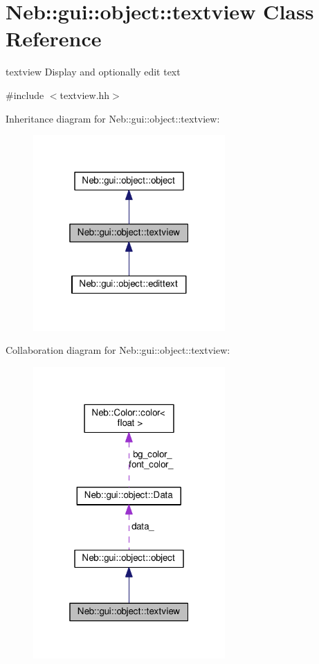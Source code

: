 \hypertarget{classNeb_1_1gui_1_1object_1_1textview}{\section{Neb\-:\-:gui\-:\-:object\-:\-:textview Class Reference}
\label{classNeb_1_1gui_1_1object_1_1textview}
}


textview Display and optionally edit text  




{\ttfamily \#include $<$textview.\-hh$>$}



Inheritance diagram for Neb\-:\-:gui\-:\-:object\-:\-:textview\-:
\nopagebreak
\begin{figure}[H]
\begin{center}
\leavevmode
\includegraphics[width=208pt]{classNeb_1_1gui_1_1object_1_1textview__inherit__graph}
\end{center}
\end{figure}


Collaboration diagram for Neb\-:\-:gui\-:\-:object\-:\-:textview\-:
\nopagebreak
\begin{figure}[H]
\begin{center}
\leavevmode
\includegraphics[width=208pt]{classNeb_1_1gui_1_1object_1_1textview__coll__graph}
\end{center}
\end{figure}
